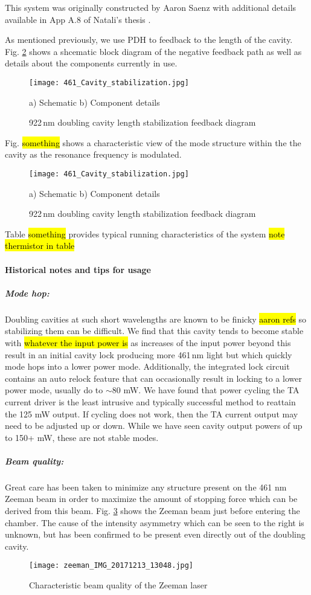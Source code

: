 This system was originally constructed by Aaron Saenz \cite{AaronDSaenz2005} with additional details available in App A.8 of Natali's thesis \cite{MartinezdeEscolar2010}.

As mentioned previously, we use PDH to feedback to the length of the cavity. 
Fig. \ref{fig:922cavityLock} shows a shcematic block diagram of the negative feedback path as well as details about the components currently in use.
	\begin{figure}
		\centerline{
		\texttt{[image: 461\_Cavity\_stabilization.jpg]}}
		\caption{922\,nm doubling cavity length stabilization feedback diagram}{a) Schematic b) Component details}
		\label{fig:922cavityLock}
	\end{figure}
	
Fig. \hl{something} shows a characteristic view of the mode structure within the the cavity as the resonance frequency is modulated.
	\begin{figure}
		\centerline{
		\texttt{[image: 461\_Cavity\_stabilization.jpg]}}
		\caption{922\,nm doubling cavity length stabilization feedback diagram}{a) Schematic b) Component details}
		\label{fig:922cavityLock}
	\end{figure}

Table \hl{something} provides typical running characteristics of the system \hl{note thermistor in table}

\paragraph{Historical notes and tips for usage}
\subparagraph{Mode hop:} 
Doubling cavities at such short wavelengths are known to be finicky \hl{aaron refs} so stabilizing them can be difficult. 
We find that this cavity tends to become stable with \hl{whatever the input power is} as increases of the input power beyond this result in an initial cavity lock producing more 461\,nm light but which quickly mode hops into a lower power mode.
Additionally, the integrated lock circuit contains an auto relock feature that can occasionally result in locking to a lower power mode, usually do to $\sim$80 mW.
We have found that power cycling the TA current driver is the least intrusive and typically successful method to reattain the 125 mW output.
If cycling does not work, then the TA current output may need to be adjusted up or down.
While we have seen cavity output powers of up to 150+ mW, these are not stable modes.

\subparagraph{Beam quality:}
Great care has been taken to minimize any structure present on the 461 nm Zeeman beam in order to maximize the amount of stopping force which can be derived from this beam.
Fig. \ref{fig:461zeemanBeam} shows the Zeeman beam just before entering the chamber.
The cause of the intensity asymmetry which can be seen to the right is unknown, but has been confirmed to be present even directly out of the doubling cavity.
	\begin{figure}
		\centerline{
		\texttt{[image: zeeman\_IMG\_20171213\_13048.jpg]}}
		\caption{Characteristic beam quality of the Zeeman laser}
		\label{fig:461zeemanBeam}
	\end{figure}

